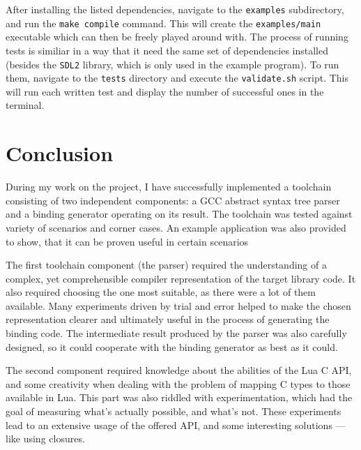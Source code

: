 \documentclass[polish, english]{iithesis}
\begin{document}
      After installing the listed dependencies, navigate to the \texttt{examples} subdirectory, and run the \texttt{make compile} command.
      This will create the \texttt{examples/main} executable which can then be freely played around with.
      The process of running tests is similiar in a way that it need the same set of dependencies installed (besides the \texttt{SDL2} library, which is only used in the example program).
      To run them, navigate to the \texttt{tests} directory and execute the \texttt{validate.sh} script.
      This will run each written test and display the number of successful ones in the terminal.

\chapter{Conclusion}
  During my work on the project, I have successfully implemented a toolchain consisting of two independent components: a GCC abstract syntax tree parser and a binding generator operating on its result.
  The toolchain was tested against variety of scenarios and corner cases.
  An example application was also provided to show, that it can be proven useful in certain scenarios

  The first toolchain component (the parser) required the understanding of a complex, yet comprehensible compiler representation of the target library code.
  It also required choosing the one most suitable, as there were a lot of them available.
  Many experiments driven by trial and error helped to make the chosen representation clearer and ultimately useful in the process of generating the binding code.
  The intermediate result produced by the parser was also carefully designed, so it could cooperate with the binding generator as best as it could.

  The second component required knowledge about the abilities of the Lua C API, and some creativity when dealing with the problem of mapping C types to those available in Lua.
  This part was also riddled with experimentation, which had the goal of measuring what's actually possible, and what's not.
  These experiments lead to an extensive usage of the offered API, and some interesting solutions --- like using closures.
\end{document}
